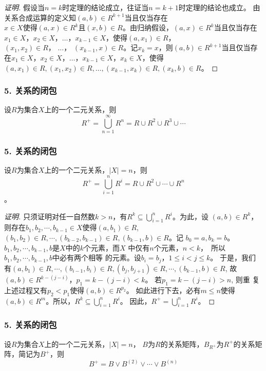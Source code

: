 \documentclass{beamer}
\begin{document}
\begin{CJK*}{UTF8}{gbsn}
\begin{frame}
\begin{proof}[证明]
  \pause 假设当$n=k$时定理的结论成立，往证当$n=k+1$时定理的结论也成立。
  \pause 由关系合成运算的定义知$(a,b)\in R^{k+1}$当且仅当存在\\$x\in X$使得$(a,x)\in R^k$且$(x, b)\in R$。\pause 由归纳假设，$(a,x)\in R^k$当且仅当存在$x_1\in X$，$x_2\in X$，$\ldots$，$x_{k-1}\in X$，使得$(a, x_1) \in R$，\\ $(x_1, x_2)\in R$，  $\ldots$， $(x_{k-1}, x)\in R$。\pause 记$x_{k}=x$，则$(a,b)\in R^{k+1}$当且仅当存在$x_1\in X$，$x_2\in X$，$\ldots$，$x_{k-1}\in X$，$x_{k}\in X$，使得\\$(a, x_1) \in R,(x_1, x_2)\in R,\ldots,(x_{k-1}, x_k)\in R,(x_k, b)\in R$。
\end{proof}

\end{frame}
\begin{frame}
  \frametitle{5. 关系的闭包}
  \begin{Thm}
    设$R$为集合$X$上的一个二元关系，则
    \begin{equation*}
      R^+ = \bigcup_{n=1}^\infty R^n = R \cup R^2 \cup R^3 \cup \cdots 
    \end{equation*}
  \end{Thm}
\end{frame}
\begin{frame}
  \frametitle{5. 关系的闭包}
  \begin{Thm}
    设$R$为集合$X$上的一个二元关系，$|X| = n$，则\[R^+ = \bigcup_{i=1}^nR^i = R \cup R^2  \cup \cdots \cup R^n \]。
  \end{Thm}
  \begin{proof}[证明]\justifying\let\raggedright\justifying\small{
    只须证明对任一自然数$k > n$，有$R^k \subseteq \bigcup_{i=1}^nR^i$。\pause 为此，设
    $(a,b) \in R^k$，则存在$b_1, b_2, \cdots, b_{k-1} \in X$使得$(a,b_1) \in R$, 
    $(b_1, b_2) \in R, \cdots, (b_{k-2}, b_{k-1})\in R, (b_{k-1}, b) \in R$。记
    $b_0 = a, b_k = b$。 \pause $b_1,b_2, \cdots, b_{k-1}, b$是$X$中的$k$个元素，而$X$
    中仅有$n$个元素，$n < k$，　所以$b_1, b_2, \cdots, b_{k-1}, b$中必有两个相等
    的元素。设$b_i=b_j$，$1 \leq i < j \leq k$。 \pause 于是，我们有$(a,b_1)\in R,
    \cdots, (b_{i-1}, b_i)\in R, (b_j, b_{j+1})\in R, \cdots, (b_{k-1},b)\in R$,
    故$(a,b)\in R^{k-(j-i)}$，$p_1=k-(j-i) < k$。 \pause 若$p_1 = k - (j - i) > n$, 则重
    复上述过程又有$p_2 < p_1$使得$(a,b) \in R^{p_2}$。 \pause 如此进行下去，必有$m \leq
    n$使得$(a,b) \in R^m$。所以，$R^k \subseteq \bigcup_{i=1}^nR^i$。 \pause 因此，$R^+=\bigcup_{i=1}^nR^i$。}
  \end{proof}
\end{frame}
\begin{frame}
  \frametitle{5. 关系的闭包}
  \begin{Thm}
    设$R$为集合$X$上的一个二元关系，$|X| = n$， $B$为$R$的关系矩阵，$B_{R^+}$为$R^+$的关系矩阵，简记为$B^+$，则
    \begin{equation*}
      B^+ = B \lor B^{(2)} \lor \cdots \lor B^{(n)}
    \end{equation*}
  \end{Thm}
\end{frame}


\end{CJK*}
\end{document}
